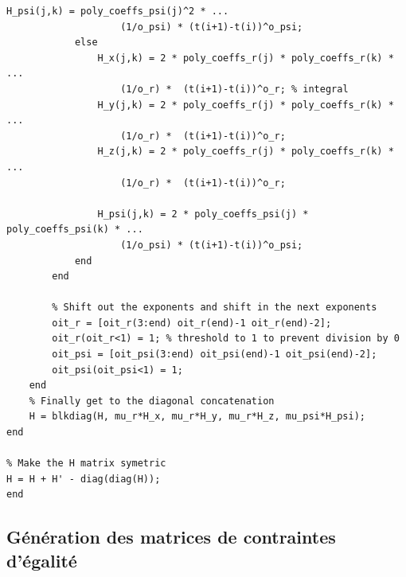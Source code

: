 \documentclass{article}
\begin{document}
\begin{lstlisting}[style=Matlab-editor]
                H_psi(j,k) = poly_coeffs_psi(j)^2 * ...
                    (1/o_psi) * (t(i+1)-t(i))^o_psi;
            else
                H_x(j,k) = 2 * poly_coeffs_r(j) * poly_coeffs_r(k) * ...
                    (1/o_r) *  (t(i+1)-t(i))^o_r; % integral
                H_y(j,k) = 2 * poly_coeffs_r(j) * poly_coeffs_r(k) * ...
                    (1/o_r) *  (t(i+1)-t(i))^o_r;
                H_z(j,k) = 2 * poly_coeffs_r(j) * poly_coeffs_r(k) * ...
                    (1/o_r) *  (t(i+1)-t(i))^o_r;
                
                H_psi(j,k) = 2 * poly_coeffs_psi(j) * poly_coeffs_psi(k) * ...
                    (1/o_psi) * (t(i+1)-t(i))^o_psi;
            end            
        end
        
        % Shift out the exponents and shift in the next exponents
        oit_r = [oit_r(3:end) oit_r(end)-1 oit_r(end)-2];
        oit_r(oit_r<1) = 1; % threshold to 1 to prevent division by 0
        oit_psi = [oit_psi(3:end) oit_psi(end)-1 oit_psi(end)-2];
        oit_psi(oit_psi<1) = 1;
    end
    % Finally get to the diagonal concatenation
    H = blkdiag(H, mu_r*H_x, mu_r*H_y, mu_r*H_z, mu_psi*H_psi);
end

% Make the H matrix symetric
H = H + H' - diag(diag(H));
end
\end{lstlisting}

\subsection{Génération des matrices de contraintes d'égalité}



\pagebreak



\end{document}
